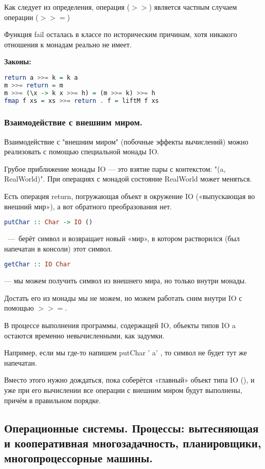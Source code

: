 \documentclass{article}
\begin{document}
Как следует из определения, операция ($>>$) является частным случаем операции ($>>=$)

Функция fail осталась в классе по историческим причинам, хотя никакого отношения к монадам реально не имеет.

\textbf{Законы:}
\begin{lstlisting}[language=Haskell]
return a >>= k = k a
m >>= return = m
m >>= (\x -> k x >>= h) = (m >>= k) >>= h
fmap f xs = xs >>= return . f = liftM f xs
\end{lstlisting}

\subsubsection{Взаимодействие с внешним миром.}
Взаимодействие с "внешним миром" (побочные эффекты вычислений) можно реализовать с помощью специальной монады IO.

Грубое приближение монады IO — это взятие пары с контекстом: "(a, RealWorld)". При операциях с монадой состояние RealWorld может меняться.

Есть операция return, погружающая объект в окружение IO («выпускающая во внешний мир»), а вот обратного преобразования нет.

\begin{lstlisting}[language=Haskell]
putChar :: Char -> IO () 
\end{lstlisting}~---~берёт символ и возвращает новый «мир», в котором растворился (был напечатан в консоли) этот символ.

\begin{lstlisting}[language=Haskell]
getChar :: IO Char
\end{lstlisting} --- мы можем получить символ из внешнего мира, но только внутри монады.

Достать его из монады мы не можем, но можем работать сним внутри IO с помощью $>>=$.

В процессе выполнения программы, содержащей IO, объекты типов IO a остаются временно невычисленными, как задумки.

Например, если мы где-то напишем putChar ' a' , то символ не будет тут же напечатан.

Вместо этого нужно дождаться, пока соберётся «главный» объект типа IO (), и уже при его вычислении все операции с внешним миром будут выполнены, причём в правильном порядке.

\subsection{Операционные системы. Процессы: вытесняющая и кооперативная многозадачность, планировщики, многопроцессорные машины.}
\end{document}
